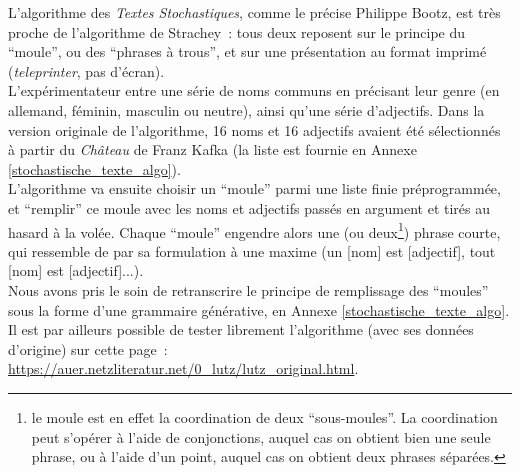 \documentclass{article}
\begin{document}
				L'algorithme des \textit{Textes Stochastiques}, comme le précise Philippe Bootz, est très proche de l'algorithme de Strachey : tous deux reposent sur le principe du ``moule'', ou des ``phrases à trous'', et sur une présentation au format imprimé (\textit{teleprinter}, pas d'écran).\\ L'expérimentateur entre une série de noms communs en précisant leur genre (en allemand, féminin, masculin ou neutre), ainsi qu'une série d'adjectifs. Dans la version originale de l'algorithme, 16 noms et 16 adjectifs avaient été sélectionnés à partir du \textit{Château} de Franz Kafka (la liste est fournie en Annexe \ref{stochastische_texte_algo}).\\
				L'algorithme va ensuite choisir un ``moule'' parmi une liste finie préprogrammée, et ``remplir'' ce moule avec les noms et adjectifs passés en argument et tirés au hasard à la volée. Chaque ``moule'' engendre alors une (ou deux\footnote{le moule est en effet la coordination de deux ``sous-moules''. La coordination peut s'opérer à l'aide de conjonctions, auquel cas on obtient bien une seule phrase, ou à l'aide d'un point, auquel cas on obtient deux phrases séparées.}) phrase courte, qui ressemble de par sa formulation à une maxime (un [nom] est [adjectif], tout [nom] est [adjectif]...).\\
				Nous avons pris le soin de retranscrire le principe de remplissage des ``moules'' sous la forme d'une grammaire générative, en Annexe \ref{stochastische_texte_algo}. Il est par ailleurs possible de tester librement l'algorithme (avec ses données d'origine) sur cette page : \href{https://auer.netzliteratur.net/0_lutz/lutz_original.html}{https://auer.netzliteratur.net/0\_lutz/lutz\_original.html}.\\
				
\end{document}
